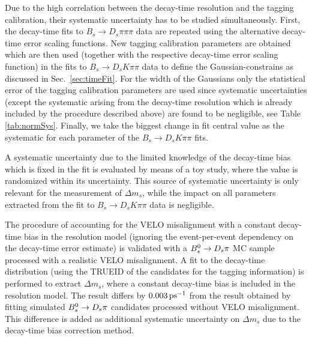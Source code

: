 Due to the high correlation between the decay-time resolution and the tagging calibration, their systematic uncertainty has to be studied simultaneously.
First, the decay-time fits to $B_s \to D_s \pi\pi\pi$ data are repeated using the alternative decay-time error scaling functions.
New tagging calibration parameters are obtained which are then used (together with the respective decay-time error scaling function) in the fits to $B_s \to D_s K\pi\pi$ data
to define the Gaussian-constrains as discussed in Sec.~\ref{sec:timeFit}.
For the width of the Gaussians only the statistical error of the tagging calibration parameters are used since systematic uncertainties (except the systematic arising from the decay-time resolution which is already included by the procedure described above) are found to be negligible, see Table \ref{tab:normSys}.
Finally, we take the biggest change in fit central value as the systematic for each parameter of the $B_s \to D_s K\pi\pi$ fits.

A systematic uncertainty due to the limited knowledge of the decay-time bias which is fixed in the fit
is evaluated by means of a toy study, where the value is randomized within its uncertainty.
This source of systematic uncertainty is only relevant for the measurement of $\Delta m_s$, 
while the impact on all parameters extracted from the fit to  $B_s \to D_s K\pi\pi$ data is negligible.

The procedure of accounting for the VELO misalignment with a constant decay-time bias in the resolution model 
(\ie ignoring the event-per-event dependency on the decay-time error estimate) is validated with a ${{B}^0_{s}}\rightarrow{\ensuremath{{D}_{s}}}{\ensuremath{\pi}}$ MC sample processed with a realistic VELO misalignment.
A fit to the decay-time distribution (using the \textsf{TRUEID} of the candidates for the tagging information) is performed to extract $\Delta m_s$, 
where a constant decay-time bias is included in the resolution model.
The result differs by $0.003{\mathrm{ \,ps^{-1}}}$ from the result obtained by fitting simulated ${{B}^0_{s}}\rightarrow{\ensuremath{{D}_{s}}}{\ensuremath{\pi}}$ candidates processed without VELO misalignment. 
This difference is added as additional systematic uncertainty on $\Delta m_s$ due to the decay-time bias correction method.


